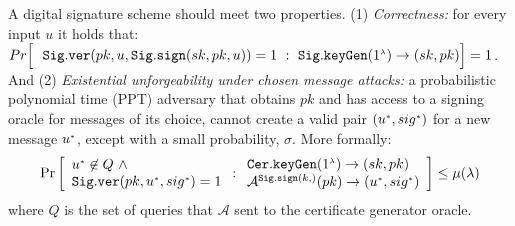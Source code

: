 
A digital signature scheme should meet  two properties. (1) \textit{Correctness:} for every input $u$ it holds that:
%
$Pr\Big[\  \  \mathtt{Sig.ver}( pk,\\ u, \mathtt{Sig.sign}(sk, pk, u))=1\ : \
\mathtt{Sig.keyGen}(1^{\scriptscriptstyle \lambda})\rightarrow (sk, pk)  \Big]=1$. And 
%
(2) \textit{Existential unforgeability under chosen message attacks:} a probabilistic polynomial time (PPT) adversary that obtains $pk$ and has access to a signing  oracle for messages of its choice, cannot create a valid pair $(u^{\scriptscriptstyle *},sig^{\scriptscriptstyle *})$ for a new message $u^{\scriptscriptstyle *}$, except with a small probability, $\sigma$. More formally: 
%
\small{
$$ \Pr\left[
  \begin{array}{l}
  u^{\st *}\not\in Q\ \wedge \\
   \mathtt{Sig.ver}( pk,  u^{\st *}, sig^{\st *}) =1\\
% 
\end{array} : 
    \begin{array}{l}
    \mathtt{Cer.keyGen}(1^{\st \lambda})\rightarrow (sk,pk) \\
  \mathcal{A}^{\mathtt{Sig.sign}(k,)}(pk)\rightarrow(u^{\st *}, sig^{\st *}) 
\end{array}    \right]\leq \mu(\lambda)$$
}
where $Q$ is the set of queries that $\mathcal{A}$ sent to the certificate generator oracle.






